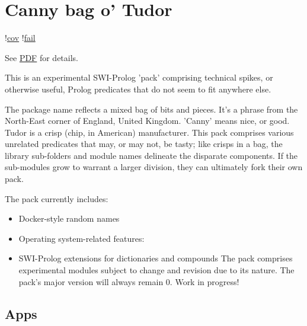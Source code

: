 
\chapter{Canny bag o' Tudor}

!\href{https://shields.io/endpoint?url=https://gist.githubusercontent.com/royratcliffe/ec92ac84832950815861d35c2f661953/raw/cov.json}{cov}
!\href{https://shields.io/endpoint?url=https://gist.githubusercontent.com/royratcliffe/ec92ac84832950815861d35c2f661953/raw/fail.json}{fail}

See \href{https://github.com/royratcliffe/canny_tudor/blob/master/man/canny_tudor.pdf}{PDF} for details.

This is an experimental SWI-Prolog 'pack' comprising technical spikes, or
otherwise useful, Prolog predicates that do not seem to fit anywhere else.

The package name reflects a mixed bag of bits and pieces. It's a phrase from the
North-East corner of England, United Kingdom. 'Canny' means nice, or good. Tudor
is a crisp (chip, in American) manufacturer. This pack comprises various
unrelated predicates that may, or may not, be tasty; like crisps in a bag, the
library sub-folders and module names delineate the disparate components. If the
sub-modules grow to warrant a larger division, they can ultimately fork their
own pack.

The pack currently includes:

\begin{itemize}
    \item Docker-style random names
    \item Operating system-related features:


    \item SWI-Prolog extensions for dictionaries and compounds
The pack comprises experimental modules subject to change and revision
due to its nature. The pack's major version will always remain 0.
Work in progress!
\end{itemize}

\section{Apps}

